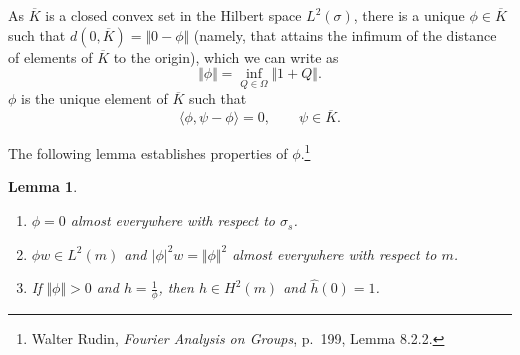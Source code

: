 \documentclass{article}
\newcommand{\inner}[2]{\langle #1, #2 \rangle}
\newcommand{\norm}[1]{\Vert #1 \Vert}
\newtheorem{lemma}[theorem]{Lemma}
\begin{document}
As $\overline{K}$ is a closed convex set in the Hilbert space $L^2(\sigma)$, there is a unique $\phi \in \overline{K}$
such that $d(0,\overline{K}) = \norm{0-\phi}$ (namely, that attains the infimum of the distance of  elements of $\overline{K}$ to the origin), which
we can write as
\[
\norm{\phi} = \inf_{Q \in \Omega} \norm{1+Q}.
\]
$\phi$ is the unique element of $\overline{K}$ such that
\[
\inner{\phi}{\psi-\phi}=0, \qquad \psi \in \overline{K}.
\]

The following lemma establishes properties of $\phi$.\footnote{Walter Rudin, {\em Fourier Analysis on Groups},
p.~199, Lemma 8.2.2.}

\begin{lemma}
\begin{enumerate}
\item $\phi=0$ almost everywhere with respect to $\sigma_s$.
\item $\phi w \in L^2(m)$ and $|\phi|^2 w = \norm{\phi}^2$ almost everywhere with respect to $m$.
\item If $\norm{\phi}>0$ and $h=\frac{1}{\phi}$, then $h \in H^2(m)$ and $\hat{h}(0)=1$.
\end{enumerate}
\label{822}
\end{lemma}
\end{document}

